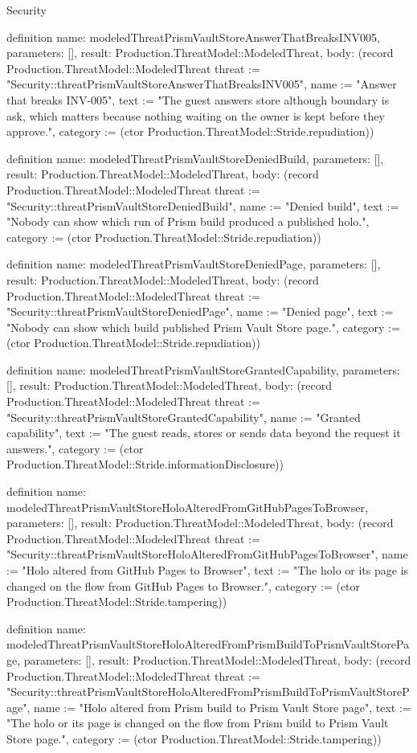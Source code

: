 \begin{lexlean}{Security}
\begin{semanticmodule}
definition{
  name: modeledThreatPrismVaultStoreAnswerThatBreaksINV005,
  parameters: [],
  result: Production.ThreatModel::ModeledThreat,
  body: (record Production.ThreatModel::ModeledThreat {threat := "Security::threatPrismVaultStoreAnswerThatBreaksINV005", name := "Answer that breaks INV-005", text := "The guest answers store although boundary is ask, which matters because nothing waiting on the owner is kept before they approve.", category := (ctor Production.ThreatModel::Stride.repudiation)})
}

definition{
  name: modeledThreatPrismVaultStoreDeniedBuild,
  parameters: [],
  result: Production.ThreatModel::ModeledThreat,
  body: (record Production.ThreatModel::ModeledThreat {threat := "Security::threatPrismVaultStoreDeniedBuild", name := "Denied build", text := "Nobody can show which run of Prism build produced a published holo.", category := (ctor Production.ThreatModel::Stride.repudiation)})
}

definition{
  name: modeledThreatPrismVaultStoreDeniedPage,
  parameters: [],
  result: Production.ThreatModel::ModeledThreat,
  body: (record Production.ThreatModel::ModeledThreat {threat := "Security::threatPrismVaultStoreDeniedPage", name := "Denied page", text := "Nobody can show which build published Prism Vault Store page.", category := (ctor Production.ThreatModel::Stride.repudiation)})
}

definition{
  name: modeledThreatPrismVaultStoreGrantedCapability,
  parameters: [],
  result: Production.ThreatModel::ModeledThreat,
  body: (record Production.ThreatModel::ModeledThreat {threat := "Security::threatPrismVaultStoreGrantedCapability", name := "Granted capability", text := "The guest reads, stores or sends data beyond the request it answers.", category := (ctor Production.ThreatModel::Stride.informationDisclosure)})
}

definition{
  name: modeledThreatPrismVaultStoreHoloAlteredFromGitHubPagesToBrowser,
  parameters: [],
  result: Production.ThreatModel::ModeledThreat,
  body: (record Production.ThreatModel::ModeledThreat {threat := "Security::threatPrismVaultStoreHoloAlteredFromGitHubPagesToBrowser", name := "Holo altered from GitHub Pages to Browser", text := "The holo or its page is changed on the flow from GitHub Pages to Browser.", category := (ctor Production.ThreatModel::Stride.tampering)})
}

definition{
  name: modeledThreatPrismVaultStoreHoloAlteredFromPrismBuildToPrismVaultStorePage,
  parameters: [],
  result: Production.ThreatModel::ModeledThreat,
  body: (record Production.ThreatModel::ModeledThreat {threat := "Security::threatPrismVaultStoreHoloAlteredFromPrismBuildToPrismVaultStorePage", name := "Holo altered from Prism build to Prism Vault Store page", text := "The holo or its page is changed on the flow from Prism build to Prism Vault Store page.", category := (ctor Production.ThreatModel::Stride.tampering)})
}


\end{semanticmodule}
\end{lexlean}
